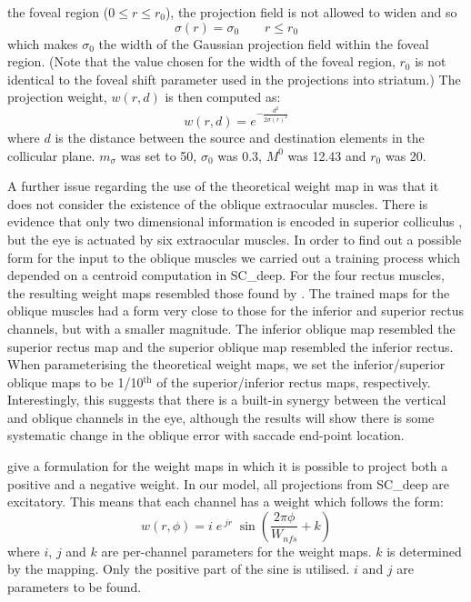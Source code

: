 \documentclass{frontiersSCNS}
\begin{document}
the foveal region ($0 \leq r \leq r_0$), the projection field is not
allowed to widen and so
\begin{equation} \label{eq:sigmar2}
\sigma(r) = \sigma_0 \qquad r \leq r_0
\end{equation}
which makes $\sigma_0$ the width of the Gaussian projection field
within the foveal region. (Note that the value chosen for the width of
the foveal region, $r_0$ is not identical to the foveal shift
parameter used in the  projections into striatum.)
The  projection weight, $w(r,d)$ is then computed
as:
\begin{equation} \label{eq:widening}
w(r,d) = e^{-\frac{d^2}{2\sigma\left(r\right)^2}}
\end{equation}
where $d$ is the distance between the source and destination elements
in the collicular plane.  $m_\sigma$ was set to 50, $\sigma_0$ was
0.3, $M^0$ was 12.43 and $r_0$ was 20.

A further issue regarding the use of the theoretical weight map
in \cite{tabareau_geometry_2007} was that it does not consider the
existence of the oblique extraocular muscles. There is evidence that
only two dimensional information is encoded in superior
colliculus
\citep{wurtz_activity_1972,hepp_monkey_1993,van_opstal_two-rather_1991},
but the eye is actuated by six extraocular muscles. In order to find
out a possible form for the input to the oblique muscles we carried
out a training process
which depended on a centroid computation in SC\_deep. For the four
rectus muscles, the resulting weight maps resembled those found by
\cite{arai_two-dimensional_1994}. The trained
maps for the oblique muscles had a form very close to those for the
inferior and superior rectus channels, but with a smaller magnitude.
The inferior oblique map resembled the superior rectus map and the
superior oblique map resembled the inferior rectus. When parameterising
the theoretical weight maps, we set the inferior/superior
oblique maps to be 1/10$^{\mathrm{th}}$ of the superior/inferior rectus
maps, respectively. Interestingly, this suggests that there is a built-in
synergy between the vertical and oblique channels in the eye, although
the results will show there is some systematic change in the oblique error
with saccade end-point location.

\cite{tabareau_geometry_2007} give a formulation for the weight maps
in which it is possible to project both a positive and a negative
weight. In our model, all projections from SC\_deep are excitatory.
This means that each channel has a weight which follows the form:
\begin{equation} \label{eq:weightmaps}
w(r,\phi) = i\;e\,^{jr}\;\sin\left(\frac{2\pi\phi}{W_{nfs}} + k\right)
\end{equation}
where $i$, $j$ and $k$ are per-channel parameters for the weight
maps. $k$ is determined by the mapping. Only the positive part of the
sine is utilised. $i$ and $j$ are parameters to be found.
\end{document}
